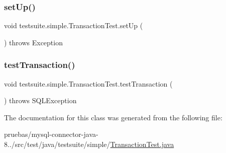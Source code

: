 \subsubsection{\texorpdfstring{set\+Up()}{setUp()}}
{\footnotesize\ttfamily void testsuite.\+simple.\+Transaction\+Test.\+set\+Up (\begin{DoxyParamCaption}{ }\end{DoxyParamCaption}) throws Exception}

\mbox{\label{classtestsuite_1_1simple_1_1_transaction_test_afd13b74216f8498467a73d6b4df6ff57}} 
\subsubsection{\texorpdfstring{test\+Transaction()}{testTransaction()}}
{\footnotesize\ttfamily void testsuite.\+simple.\+Transaction\+Test.\+test\+Transaction (\begin{DoxyParamCaption}{ }\end{DoxyParamCaption}) throws S\+Q\+L\+Exception}



The documentation for this class was generated from the following file\+:\begin{DoxyCompactItemize}
\item 
pruebas/mysql-\/connector-\/java-\/8../src/test/java/testsuite/simple/\mbox{\hyperlink{simple_2_transaction_test_8java}{Transaction\+Test.\+java}}\end{DoxyCompactItemize}
